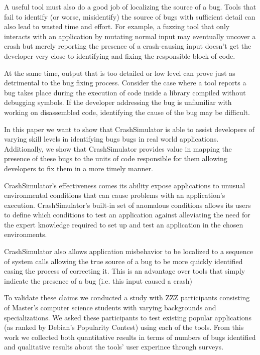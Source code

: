 A useful tool must also do a good job of localizing the source of a bug.
Tools that fail to identify (or worse, misidentify) the source of bugs with
sufficient detail can also lead to wasted time and effort.  For example, a
fuzzing tool that only interacts with an application by mutating normal
input may eventually uncover a crash but merely reporting the presence of a
crash-causing input doesn't get the developer very close to identifying and
fixing the responsible block of code.

At the same time, output that is too detailed or low level can prove just
as detrimental to the bug fixing process.  Consider the case where a tool
reports a bug takes place during the execution of code inside a library
compiled without debugging symbols.  If the developer addressing the bug is
unfamiliar with working on disassembled code, identifying the cause of the
bug may be difficult.

In this paper we want to show that CrashSimulator is able to assist
developers of varying skill levels in identifying bugs bugs in real world
applications.  Additionally, we show that CrashSimulator provides value in
mapping the presence of these bugs to the units of code responsible for
them allowing developers to fix them in a more timely manner.

CrashSimulator's effectiveness comes its ability expose applications to
unusual environmental conditions that can cause problems with an
application's execution.  CrashSimulator's built-in set of anomalous
conditions allows its users to define which conditions to test an
application against alleviating the need for the expert knowledge required
to set up and test an application in the chosen environments.

CrashSimulator also allows application misbehavior to be localized to a
sequence of system calls allowing the true source of a bug to be more
quickly identified easing the process of correcting it.  This is an
advantage over tools that simply indicate the presence of a bug (i.e.  this
input caused a crash)

To validate these claims we conducted a study with ZZZ participants
consisting of Master's computer science students with varying backgrounds
and specializations.  We asked these participants to test existing popular
applications (as ranked by Debian's Popularity Contest) using each of the
tools.  From this work we collected both quantitative results in terms of
numbers of bugs identified and qualitative results about the tools' user
experince through surveys.

